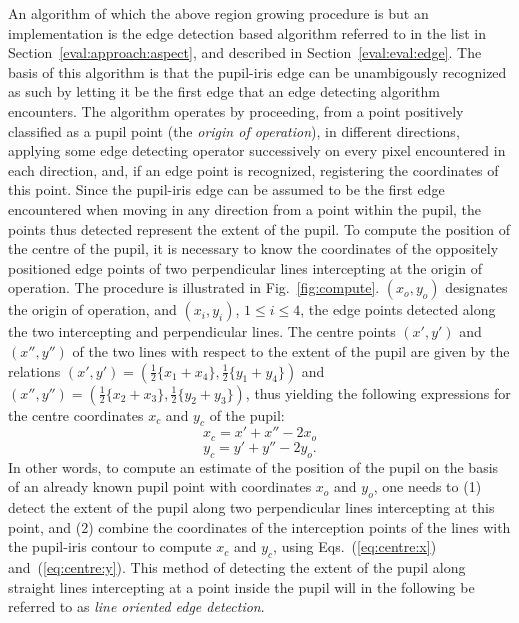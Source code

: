 An algorithm of which the above region growing procedure is but an
implementation is the edge detection based algorithm referred to in
the list in Section~\ref{eval:approach:aspect}, and described in
Section~\ref{eval:eval:edge}.  The basis of this algorithm is that the
pupil-iris edge can be unambigously recognized as such by letting it
be the first edge that an edge detecting algorithm encounters.  The
algorithm operates by proceeding, from a point positively classified
as a pupil point (the {\em origin of operation\/}), in different
directions, applying some edge detecting operator successively on
every pixel encountered in each direction, and, if an edge point is
recognized, registering the coordinates of this point.  Since the
pupil-iris edge can be assumed to be the first edge encountered when
moving in any direction from a point within the pupil, the points thus
detected represent the extent of the pupil.  To compute the position
of the centre of the pupil, it is necessary to know the coordinates of
the oppositely positioned edge points of two perpendicular lines
intercepting at the origin of operation.  The procedure is illustrated
in Fig.~\ref{fig:compute}.  $(x_{o},y_{o})$ designates the origin of
operation, and $(x_{i},y_{i})$, $1\leq i\leq 4$, the edge points
detected along the two intercepting and perpendicular lines.  The
centre points $(x',y')$ and $(x'',y'')$ of the two lines with respect
to the extent of the pupil are given by the relations
$(x',y')=(\frac{1}{2}\{x_{1}+x_{4}\},\frac{1}{2}\{y_{1}+y_{4}\})$ and
$(x'',y'')=(\frac{1}{2}\{x_{2}+x_{3}\},\frac{1}{2}\{y_{2}+y_{3}\})$,
thus yielding the following expressions for the centre coordinates
$x_{c}$ and $y_{c}$ of the pupil:
\begin{equation}
\label{eq:centre:x}
  x_{c}=x'+x''-2x_{o}
\end{equation}
\begin{equation}
\label{eq:centre:y}
  y_{c}=y'+y''-2y_{o}\mbox{.}
\end{equation}
In other words, to compute an estimate of the position of the pupil on
the basis of an already known pupil point with coordinates $x_{o}$ and
$y_{o}$, one needs to (1) detect the extent of the pupil along two
perpendicular lines intercepting at this point, and (2) combine the
coordinates of the interception points of the lines with the
pupil-iris contour to compute $x_{c}$ and $y_{c}$, using
Eqs.~(\ref{eq:centre:x}) and~(\ref{eq:centre:y}).  This method of
detecting the extent of the pupil along straight lines intercepting at
a point inside the pupil will in the following be referred to as {\em
  line oriented edge detection\/}.  

